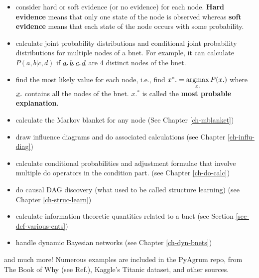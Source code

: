 \begin{itemize}

\item consider hard or soft evidence (or no evidence)
for each node. {\bf Hard evidence} means that only
one state of the node is observed whereas {\bf soft
evidence} means that each state of the node occurs with some probability.


\item calculate joint probability distributions and conditional joint probability distributions for multiple nodes of a bnet.
For example, it can calculate  $P(a,b|c,d)$ if ${\underline{a}}, {\underline{b}}, {\underline{c}}, {\underline{d}}$ 
are 4  distinct nodes of the bnet.


\item find
the most likely value for each node, i.e., find  $x^*.=\mathop{\mathrm{argmax}}\limits_{x.}P(x.)$ where ${\underline{x}}.$ contains
 all the nodes of the bnet. $x.^*$ is called the {\bf most probable explanation}.


\item calculate the Markov blanket for any node (See Chapter \ref{ch-mblanket})

\item draw influence diagrams and do associated calculations (see Chapter \ref{ch-influ-diag})

\item calculate conditional probabilities and adjustment formulae  that involve multiple do operators in the condition part. (see Chapter \ref{ch-do-calc})

\item do causal DAG discovery (what used to be called structure learning) (see Chapter \ref{ch-struc-learn})

\item calculate information theoretic quantities related to a bnet (see Section \ref{sec-def-various-ents})

\item handle dynamic Bayesian networks (see Chapter \ref{ch-dyn-bnets})
\end{itemize}
and much more! Numerous examples are included in the 
PyAgrum repo, from The Book of Why (see Ref.\cite{book-why}), Kaggle's Titanic dataset, and other sources.

